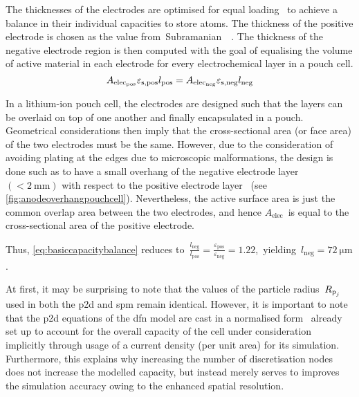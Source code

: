 The  thicknesses  of the  electrodes  are  optimised  for equal  loading  \ie~to
achieve   a  balance   in   their  individual   capacities   to  store   
atoms.  The  thickness  of  the  positive  electrode  is  chosen  as  the  value
from~Subramanian~\etal{}~\cite{Subramanian2009}. The  thickness of  the negative
electrode region  is then  computed with  the goal of  equalising the  volume of
active material  in each electrode  for every  electrochemical layer in  a pouch
cell.
\begin{equation}\label{eq:basiccapacitybalance}
    A_{\text{elec}_\text{pos}}\varepsilon_{\text{s,pos}} l_\text{pos} = A_{\text{elec}_\text{neg}}\varepsilon_{\text{s,neg}} l_\text{neg}
\end{equation}

In a  lithium-ion pouch cell, the  electrodes are designed such  that the layers
can be  overlaid on  top of  one another  and finally  encapsulated in  a pouch.
Geometrical considerations  then imply  that the  cross-sectional area  (or face
area) of the two electrodes must be  the same. However, due to the consideration
of  avoiding  plating  at  the  edges  due  to  microscopic  malformations,  the
design  is done  such as  to have  a small  overhang of  the negative  electrode
layer~${(<  \SI{2}{\milli\meter})}$  with  respect  to  the  positive  electrode
layer~\cite{Bond2017} (see \cref{fig:anodeoverhangpouchcell}). Nevertheless, the
active surface area is just the  common overlap area between the two electrodes,
and hence $A_\text{elec}$~is  equal to the cross-sectional area  of the positive
electrode.

Thus, \cref{eq:basiccapacitybalance} reduces to~${\frac{l_\text{neg}}{l_\text{pos}} =
\frac{\varepsilon_\text{pos}}{\varepsilon_\text{neg}} = 1.22}$,~yielding~${l_\text{neg} = \SI{72}{\micro\meter}}$.

At  first,  it may  be  surprising  to note  that  the  values of  the  particle
radius~$R_{{\text{p}_j}}$  used  in both  the  \gls{p2d}  and \gls{spm}  remain  identical.
However, it is  important to note that the \gls{p2d}  equations of the \gls{dfn}
model  are cast  in a  normalised form  \ie~already set  up to  account for  the
overall capacity of  the cell under consideration implicitly through  usage of a
current density (per  unit area) for its simulation.  Furthermore, this explains
why increasing the number of discretisation nodes does not increase the modelled
capacity, but instead merely serves to improves the simulation accuracy owing to
the enhanced spatial resolution.

